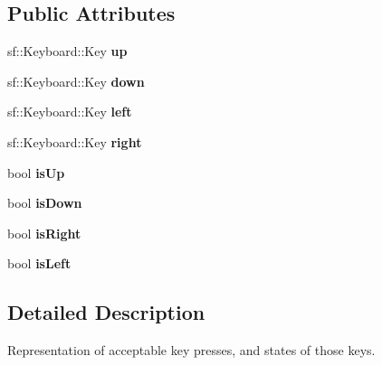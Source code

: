 \subsection*{Public Attributes}
\begin{DoxyCompactItemize}
\item 
\hypertarget{structAUserInput_1_1SKeyStates_a738215f9ee9440c8f11aa0a10fa83d42}{sf\-::\-Keyboard\-::\-Key {\bfseries up}}\label{structAUserInput_1_1SKeyStates_a738215f9ee9440c8f11aa0a10fa83d42}

\item 
\hypertarget{structAUserInput_1_1SKeyStates_a95d21217e452090bd28017c8b1110e5d}{sf\-::\-Keyboard\-::\-Key {\bfseries down}}\label{structAUserInput_1_1SKeyStates_a95d21217e452090bd28017c8b1110e5d}

\item 
\hypertarget{structAUserInput_1_1SKeyStates_aea4dc08983d8f716718a3792c779ff5c}{sf\-::\-Keyboard\-::\-Key {\bfseries left}}\label{structAUserInput_1_1SKeyStates_aea4dc08983d8f716718a3792c779ff5c}

\item 
\hypertarget{structAUserInput_1_1SKeyStates_aa9551aac4a89e8c78e20d4a12a8afcee}{sf\-::\-Keyboard\-::\-Key {\bfseries right}}\label{structAUserInput_1_1SKeyStates_aa9551aac4a89e8c78e20d4a12a8afcee}

\item 
\hypertarget{structAUserInput_1_1SKeyStates_ab227ece210dcf94947d71b21b6ea906e}{bool {\bfseries is\-Up}}\label{structAUserInput_1_1SKeyStates_ab227ece210dcf94947d71b21b6ea906e}

\item 
\hypertarget{structAUserInput_1_1SKeyStates_af06f59dc7cb752237f23e6aceac4453e}{bool {\bfseries is\-Down}}\label{structAUserInput_1_1SKeyStates_af06f59dc7cb752237f23e6aceac4453e}

\item 
\hypertarget{structAUserInput_1_1SKeyStates_afcf8a092b05f9ce67f4b2c5ea73a1f40}{bool {\bfseries is\-Right}}\label{structAUserInput_1_1SKeyStates_afcf8a092b05f9ce67f4b2c5ea73a1f40}

\item 
\hypertarget{structAUserInput_1_1SKeyStates_ab29367ed4bde7e4dd9884d75f300e5ec}{bool {\bfseries is\-Left}}\label{structAUserInput_1_1SKeyStates_ab29367ed4bde7e4dd9884d75f300e5ec}

\end{DoxyCompactItemize}


\subsection{Detailed Description}
Representation of acceptable key presses, and states of those keys. 

